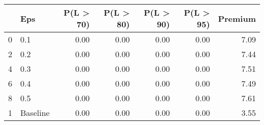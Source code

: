 \begin{tabular}{llrrrrr}
\toprule
{} &       Eps &  P(L > 70) &  P(L > 80) &  P(L > 90) &  P(L > 95) &  Premium \\
\midrule
0 &       0.1 &       0.00 &       0.00 &       0.00 &       0.00 &     7.09 \\
2 &       0.2 &       0.00 &       0.00 &       0.00 &       0.00 &     7.44 \\
4 &       0.3 &       0.00 &       0.00 &       0.00 &       0.00 &     7.51 \\
6 &       0.4 &       0.00 &       0.00 &       0.00 &       0.00 &     7.49 \\
8 &       0.5 &       0.00 &       0.00 &       0.00 &       0.00 &     7.61 \\
1 &  Baseline &       0.00 &       0.00 &       0.00 &       0.00 &     3.55 \\
\bottomrule
\end{tabular}
